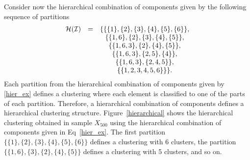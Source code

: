 \documentclass[10pt, a4paper]{article}
\begin{document}
\begin{spacing}{1.9}
Consider now the hierarchical combination of components given by the following sequence of partitions
\begin{equation}
\begin{array}{r c c}
\mathcal{H}(\mathcal{I}) &=& \{ \{\{1\},\{2\},\{3\},\{4\},\{5\},\{6\}\}, \\
   & & \{\{1, 6\},\{2\},\{3\},\{4\},\{5\} \}, \\
   & &    \{\{1, 6, 3\},\{2\},\{4\},\{5\} \}, \\
   & &    \{\{1, 6, 3\},\{2, 5\},\{4 \} \}, \\
    & &   \{\{1, 6, 3\},\{2, 4, 5\} \}, \\
   & &    \{\{1, 2, 3, 4, 5, 6\}\} \}.
\end{array}
\label{hier_ex}
\end{equation}
Each partition from the hierarchical combination of components given by \ref{hier_ex} defines a clustering where each element is classified to one of the parts of each partition. Therefore, a hierarchical combination of components defines a hierarchical clustering structure. Figure~\ref{hierarchical} shows the hierarchical clustering obtained in sample $X_{500}$ using the hierarchical combination of components given in Eq~\ref{hier_ex}. The first partition $\{\{1\},\{2\},\{3\},\{4\},\{5\},\{6\}\}$ defines a clustering with 6 clusters, the partition $\{\{1, 6\}, \{3\},\{2\},\{4\},\{5\} \}$ defines a clustering with 5 clusters, and so on.


\end{spacing}
\end{document}
